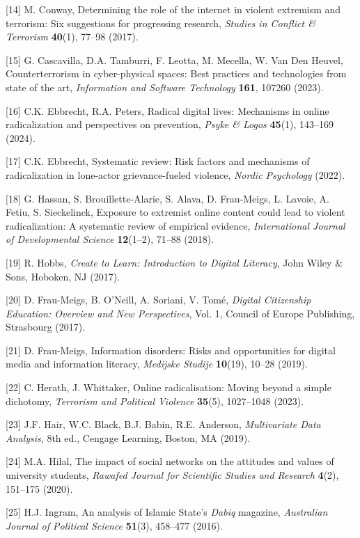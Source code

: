 \documentclass[11pt,a4paper]{article}
\begin{document}
	[14] M. Conway, Determining the role of the internet in violent extremism and terrorism: Six suggestions for progressing research, \textit{Studies in Conflict \& Terrorism} \textbf{40}(1), 77--98 (2017).
	
	[15] G. Cascavilla, D.A. Tamburri, F. Leotta, M. Mecella, W. Van Den Heuvel, Counterterrorism in cyber-physical spaces: Best practices and technologies from state of the art, \textit{Information and Software Technology} \textbf{161}, 107260 (2023).
	
	[16] C.K. Ebbrecht, R.A. Peters, Radical digital lives: Mechanisms in online radicalization and perspectives on prevention, \textit{Psyke \& Logos} \textbf{45}(1), 143--169 (2024).
	
	[17] C.K. Ebbrecht, Systematic review: Risk factors and mechanisms of radicalization in lone-actor grievance-fueled violence, \textit{Nordic Psychology} (2022).
	
	[18] G. Hassan, S. Brouillette-Alarie, S. Alava, D. Frau-Meigs, L. Lavoie, A. Fetiu, S. Sieckelinck, Exposure to extremist online content could lead to violent radicalization: A systematic review of empirical evidence, \textit{International Journal of Developmental Science} \textbf{12}(1--2), 71--88 (2018).
	
	[19] R. Hobbs, \textit{Create to Learn: Introduction to Digital Literacy}, John Wiley \& Sons, Hoboken, NJ (2017).
	
	[20] D. Frau-Meigs, B. O'Neill, A. Soriani, V. Tomé, \textit{Digital Citizenship Education: Overview and New Perspectives}, Vol. 1, Council of Europe Publishing, Strasbourg (2017).
	
	[21] D. Frau-Meigs, Information disorders: Risks and opportunities for digital media and information literacy, \textit{Medijske Studije} \textbf{10}(19), 10--28 (2019).
	
	[22] C. Herath, J. Whittaker, Online radicalisation: Moving beyond a simple dichotomy, \textit{Terrorism and Political Violence} \textbf{35}(5), 1027--1048 (2023).
	
	[23] J.F. Hair, W.C. Black, B.J. Babin, R.E. Anderson, \textit{Multivariate Data Analysis}, 8th ed., Cengage Learning, Boston, MA (2019).
	
	[24] M.A. Hilal, The impact of social networks on the attitudes and values of university students, \textit{Rawafed Journal for Scientific Studies and Research} \textbf{4}(2), 151--175 (2020).
	
	[25] H.J. Ingram, An analysis of Islamic State's \textit{Dabiq} magazine, \textit{Australian Journal of Political Science} \textbf{51}(3), 458--477 (2016).
	
\end{document}
